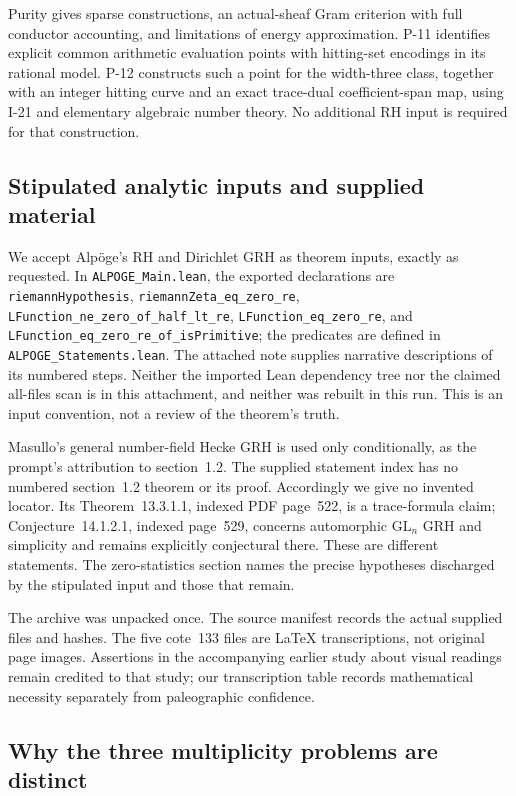 Purity gives sparse constructions, an actual-sheaf Gram criterion with full conductor accounting, and limitations of energy approximation. P-11 identifies explicit common arithmetic evaluation points with hitting-set encodings in its rational model. P-12 constructs such a point for the width-three class, together with an integer hitting curve and an exact trace-dual coefficient-span map, using I-21 and elementary algebraic number theory. No additional RH input is required for that construction.

\subsection{Stipulated analytic inputs and supplied material}

We accept Alp\"oge's RH and Dirichlet GRH as theorem inputs, exactly as requested. In \texttt{ALPOGE\_Main.lean}, the exported declarations are \texttt{riemannHypothesis}, \texttt{riemannZeta\_eq\_zero\_re}, \texttt{LFunction\_ne\_zero\_of\_half\_lt\_re}, \texttt{LFunction\_eq\_zero\_re}, and \texttt{LFunction\_eq\_zero\_re\_of\_isPrimitive}; the predicates are defined in \texttt{ALPOGE\_Statements.lean}. The attached note supplies narrative descriptions of its numbered steps. Neither the imported Lean dependency tree nor the claimed all-files scan is in this attachment, and neither was rebuilt in this run. This is an input convention, not a review of the theorem's truth.

Masullo's general number-field Hecke GRH is used only conditionally, as the prompt's attribution to section~1.2. The supplied statement index has no numbered section~1.2 theorem or its proof. Accordingly we give no invented locator. Its Theorem~13.3.1.1, indexed PDF page~522, is a trace-formula claim; Conjecture~14.1.2.1, indexed page~529, concerns automorphic $\mathrm{GL}_n$ GRH and simplicity and remains explicitly conjectural there. These are different statements. The zero-statistics section names the precise hypotheses discharged by the stipulated input and those that remain.

The archive was unpacked once. The source manifest records the actual supplied files and hashes. The five cote~133 files are LaTeX transcriptions, not original page images. Assertions in the accompanying earlier study about visual readings remain credited to that study; our transcription table records mathematical necessity separately from paleographic confidence.

\subsection{Why the three multiplicity problems are distinct}

